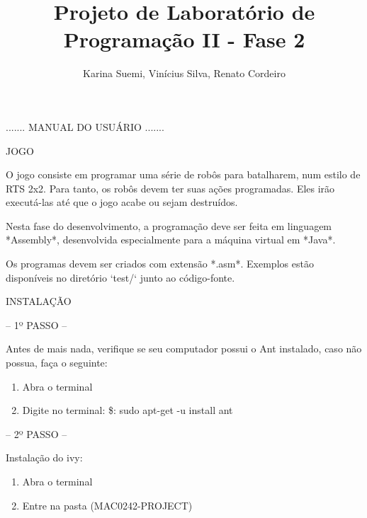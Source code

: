 \documentclass[a4paper]{article}
\title  {Projeto de Laboratório de Programação II - Fase 2}
\author {Karina Suemi, Vinícius Silva, Renato Cordeiro}
\date   {}
\begin{document}
\maketitle

\bigskip
\bigskip
\bigskip
\bigskip

{\textcolor{NavyBlue}{\Huge{....... MANUAL DO USUÁRIO .......}}


\newpage

     
{\textcolor{NavyBlue}{\LARGE JOGO }

\bigskip

O  jogo consiste  em programar uma  série de 
robôs para batalharem, num estilo de RTS 2x2.
Para  tanto,  os robôs devem  ter suas ações 
programadas. Eles irão executá-las até que o 
jogo acabe ou sejam destruídos.

Nesta fase do desenvolvimento, a programação 
deve  ser  feita   em  linguagem  *Assembly*,
desenvolvida  especialmente  para  a máquina 
virtual  em *Java*. 

Os programas devem  ser criados com extensão 
*.asm*.   Exemplos   estão   disponíveis  no 
diretório `test/` junto ao código-fonte. 



\bigskip
\bigskip
\bigskip
\bigskip


{\textcolor{NavyBlue}{\LARGE INSTALAÇÃO }
                
\bigskip
                                            
\textcolor{NavyBlue}{-- 1º PASSO --}

Antes de mais nada, verifique se seu computador possui
o Ant instalado, caso não possua, faça o seguinte:

\begin{enumerate}
	\item Abra o terminal

	\item Digite no terminal: \$: sudo apt-get -u install ant
\end{enumerate}

\bigskip



\textcolor{NavyBlue}{-- 2º PASSO --}

Instalação do ivy:

\begin{enumerate}
	\item Abra o terminal

	\item Entre na pasta (MAC0242-PROJECT)


\end{enumerate}}}}
\end{document}

